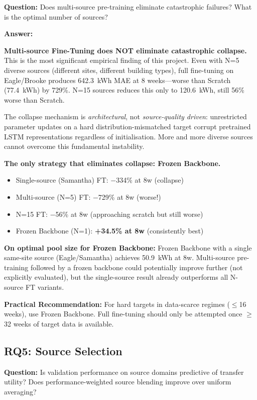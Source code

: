\documentclass[12pt,a4paper]{report}
\begin{document}
\textbf{Question:} Does multi-source pre-training eliminate catastrophic failures? What is the optimal number of sources?

\textbf{Answer:}

\textbf{Multi-source Fine-Tuning does NOT eliminate catastrophic collapse.} This is the most significant empirical finding of this project. Even with N=5 diverse sources (different sites, different building types), full fine-tuning on Eagle/Brooke produces 642.3~kWh MAE at 8 weeks---worse than Scratch (77.4~kWh) by 729\%. N=15 sources reduces this only to 120.6~kWh, still 56\% worse than Scratch.

The collapse mechanism is \textit{architectural}, not \textit{source-quality driven}: unrestricted parameter updates on a hard distribution-mismatched target corrupt pretrained LSTM representations regardless of initialisation. More and more diverse sources cannot overcome this fundamental instability.

\textbf{The only strategy that eliminates collapse: Frozen Backbone.}

\begin{itemize}
    \item Single-source (Samantha) FT: $-$334\% at 8w (collapse)
    \item Multi-source (N=5) FT: $-$729\% at 8w (worse!)
    \item N=15 FT: $-$56\% at 8w (approaching scratch but still worse)
    \item Frozen Backbone (N=1): \textbf{+34.5\% at 8w} (consistently best)
\end{itemize}

\textbf{On optimal pool size for Frozen Backbone:} Frozen Backbone with a single same-site source (Eagle/Samantha) achieves 50.9~kWh at 8w. Multi-source pre-training followed by a frozen backbone could potentially improve further (not explicitly evaluated), but the single-source result already outperforms all N-source FT variants.

\textbf{Practical Recommendation:} For hard targets in data-scarce regimes ($\leq$16 weeks), use Frozen Backbone. Full fine-tuning should only be attempted once $\geq$32 weeks of target data is available.

\subsection{RQ5: Source Selection}

\textbf{Question:} Is validation performance on source domains predictive of transfer utility? Does performance-weighted source blending improve over uniform averaging?
\end{document}
